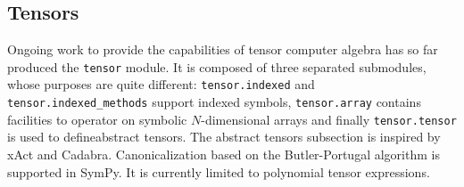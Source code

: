 \subsection{Tensors}

Ongoing work to provide the capabilities of tensor computer algebra has so far
produced the \verb|tensor| module.  It is composed of three separated
submodules, whose purposes are quite different: \verb|tensor.indexed| and
\verb|tensor.indexed_methods| support indexed symbols,
\verb|tensor.array| contains facilities to operator on symbolic $N$-dimensional
arrays and finally \verb|tensor.tensor| is used to defineabstract tensors.
The abstract tensors subsection
is inspired by xAct\cite{xAct} and Cadabra\cite{Peeters2007cadabra}.
Canonicalization based on the Butler-Portugal\cite{ManssurPortugal1999}
algorithm is supported in SymPy.  It is currently limited to polynomial tensor
expressions.

